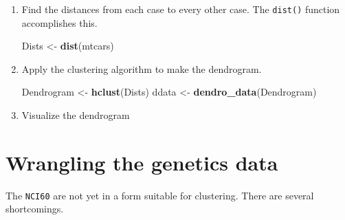 \documentclass[]{tufte-handout}
\newenvironment{Shaded}{}{}
\newcommand{\KeywordTok}[1]{\textcolor[rgb]{0.00,0.44,0.13}{\textbf{{#1}}}}
\newcommand{\DataTypeTok}[1]{\textcolor[rgb]{0.56,0.13,0.00}{{#1}}}
\newcommand{\DecValTok}[1]{\textcolor[rgb]{0.25,0.63,0.44}{{#1}}}
\newcommand{\StringTok}[1]{\textcolor[rgb]{0.25,0.44,0.63}{{#1}}}
\newcommand{\OtherTok}[1]{\textcolor[rgb]{0.00,0.44,0.13}{{#1}}}
\newcommand{\NormalTok}[1]{{#1}}
\begin{document}
\begin{enumerate}
\def\labelenumi{\arabic{enumi}.}
\item
  Find the distances from each case to every other case. The
  \texttt{dist()} function accomplishes this.

\begin{Shaded}
\begin{Highlighting}[]
\NormalTok{Dists <-}\StringTok{ }\KeywordTok{dist}\NormalTok{(mtcars)}
\end{Highlighting}
\end{Shaded}

  \vspace*{-.2in}
\item
  Apply the clustering algorithm to make the dendrogram.

\begin{Shaded}
\begin{Highlighting}[]
\NormalTok{Dendrogram <-}\StringTok{ }\KeywordTok{hclust}\NormalTok{(Dists)}
\NormalTok{ddata <-}\StringTok{ }\KeywordTok{dendro_data}\NormalTok{(Dendrogram)}
\end{Highlighting}
\end{Shaded}

  \vspace*{-.2in}
\item
  Visualize the dendrogram

\begin{Shaded}
\end{Shaded}
\end{enumerate}

\section{Wrangling the genetics data}\label{wrangling-the-genetics-data}

The \texttt{NCI60} are not yet in a form suitable for clustering. There
are several shortcomings.
\end{document}

